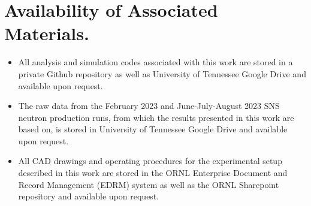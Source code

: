 \chapter{Availability of Associated Materials.}

\begin{itemize}
    \item All analysis and simulation codes associated with this work are stored in a private Github repository as well as University of Tennessee Google Drive and available upon request. 

    \item The raw data from the February 2023 and June-July-August 2023 SNS neutron production runs, from which the results presented in this work are based on, is stored in University of Tennessee Google Drive and available upon request. 

    \item All CAD drawings and operating procedures for the experimental setup described in this work are stored in the ORNL Enterprise Document and Record Management (EDRM) system as well as the ORNL Sharepoint repository and available upon request.
\end{itemize}
 